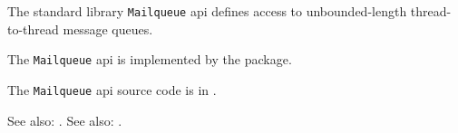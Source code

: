
The standard library {\tt Mailqueue} api defines access to unbounded-length thread-to-thread message queues.

The {\tt Mailqueue} api is implemented by the  package.

The {\tt Mailqueue} api source code is in .

See also: .
See also: .





